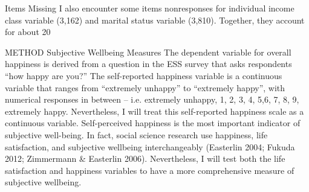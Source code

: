 Items Missing
I also encounter some items nonresponses for individual income class variable (3,162) and marital status variable (3,810). Together, they account for about 20%

METHOD
Subjective Wellbeing Measures
The dependent variable for overall happiness is derived from a question in the ESS survey that asks respondents “how happy are you?” The self-reported happiness variable is a continuous variable that ranges from “extremely unhappy” to “extremely happy”, with numerical responses in between – i.e. extremely unhappy, 1, 2, 3, 4, 5,6, 7, 8, 9, extremely happy. Nevertheless, I will treat this self-reported happiness scale as a continuous variable. Self-perceived happiness is the most important indicator of subjective well-being. In fact, social science research use happiness, life satisfaction, and subjective wellbeing interchangeably (Easterlin 2004; Fukuda 2012; Zimmermann & Easterlin 2006). Nevertheless, I will test both the life satisfaction and happiness variables to have a more comprehensive measure of subjective wellbeing.

